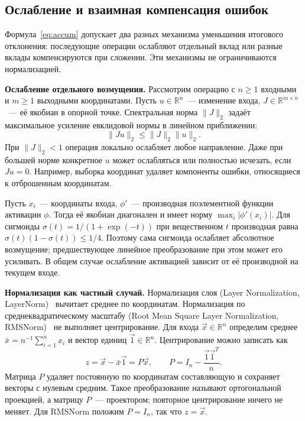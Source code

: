 \subsection{Ослабление и взаимная компенсация ошибок}

Формула~\eqref{eq:accum} допускает два разных механизма уменьшения
итогового отклонения: последующие операции ослабляют отдельный вклад
или разные вклады компенсируются при сложении. Эти механизмы
не ограничиваются нормализацией.

\textbf{Ослабление отдельного возмущения.}
Рассмотрим операцию с $n\ge1$ входными и $m\ge1$ выходными координатами.
Пусть $u\in\mathbb{R}^{n}$~--- изменение входа,
$J\in\mathbb{R}^{m\times n}$~--- её якобиан в опорной точке.
Спектральная норма $\|J\|_2$ задаёт максимальное усиление евклидовой
нормы в линейном приближении:
\[
    \|Ju\|_2\le\|J\|_2\|u\|_2.
\]
При $\|J\|_2<1$ операция локально ослабляет любое направление.
Даже при большей норме конкретное $u$ может ослабляться
или полностью исчезать, если $Ju=0$.
Например, выборка координат удаляет компоненты ошибки,
относящиеся к отброшенным координатам.

Пусть $x_i$~--- координаты входа, $\phi'$~--- производная
поэлементной функции активации $\phi$. Тогда её якобиан диагонален
и имеет норму $\max_i|\phi'(x_i)|$.
Для сигмоиды $\sigma(t)=1/(1+\exp(-t))$ при вещественном $t$ производная равна
$\sigma(t)(1-\sigma(t))\le1/4$. Поэтому сама сигмоида ослабляет
абсолютное возмущение; предшествующее линейное преобразование при этом
может его усиливать. В общем случае ослабление активацией зависит
от её производной на текущем входе.

\textbf{Нормализация как частный случай.}
Нормализация слоя (Layer Normalization, LayerNorm)~\cite{Ba2016}
вычитает среднее по координатам. Нормализация по среднеквадратическому
масштабу (Root Mean Square Layer Normalization, RMSNorm)~\cite{Zhang2019}
не выполняет центрирование.
Для входа $\Vec{x}\in\mathbb{R}^{n}$ определим среднее
$\bar x=n^{-1}\sum_{i=1}^{n}x_i$ и вектор единиц $\Vec{1}\in\mathbb{R}^{n}$.
Центрирование можно записать как
\[
    z=\Vec{x}-\bar x\Vec{1}=P\Vec{x},\qquad
    P=I_n-\frac{\Vec{1}\Vec{1}^{T}}{n}.
\]
Матрица $P$ удаляет постоянную по координатам составляющую и сохраняет
векторы с нулевым средним. Такое преобразование называют ортогональной проекцией, а матрицу $P$~---
проектором; повторное центрирование ничего не меняет.
Для RMSNorm положим $P=I_n$, так что $z=\Vec{x}$.

